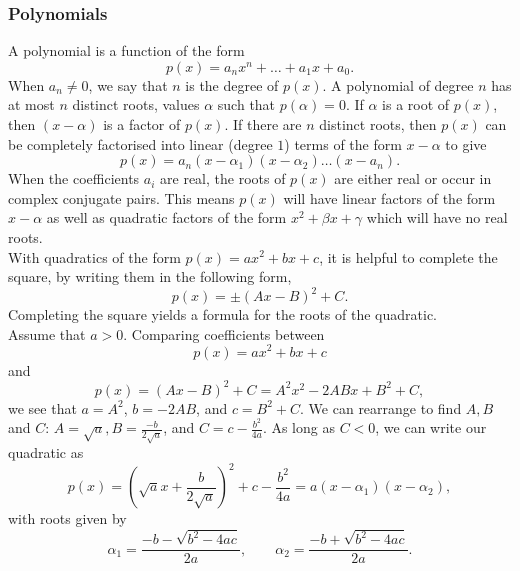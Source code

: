 \documentclass[10pt, a4paper]{article}
\begin{document}
\subsubsection{Polynomials}
A polynomial is a function of the form
\[
p(x) = a_n x ^ n + \dotsc + a_1 x + a_0.
\]
When $a_n \neq 0$, we say that $n$ is the degree of $p(x)$. A polynomial of degree $n$ has at most $n$ distinct roots, values $\alpha$ such that $p(\alpha) = 0$. If $\alpha$ is a root of $p(x)$, then $(x - \alpha)$ is a factor of $p(x)$. If there are $n$ distinct roots, then $p(x)$ can be completely factorised into linear (degree $1$) terms of the form $x - \alpha$ to give
\[
p(x) = a_n (x - \alpha_1)(x - \alpha_2)\dotsc(x - a_n). 
\]
When the coefficients $a_i$ are real, the roots of $p(x)$ are either real or occur in complex conjugate pairs. This means $p(x)$ will have linear factors of the form $x - \alpha$ as well as quadratic factors of the form $x ^ 2 + \beta x + \gamma$ which will have no real roots. \\
With quadratics of the form $p(x) = ax ^ 2 + bx + c$, it is helpful to complete the square, by writing them in the following form,
\[
p(x) = \pm (Ax - B) ^ 2 + C.
\]
Completing the square yields a formula for the roots of the quadratic. \\
Assume that $a > 0$. Comparing coefficients between
\[
p(x) = ax ^ 2 + bx + c
\]
and
\[
p(x) = (Ax - B) ^ 2 + C = A ^ 2 x ^ 2 - 2ABx + B ^ 2 + C,
\]
we see that $a = A ^ 2$, $b = -2AB$, and $c = B ^ 2 + C$. We can rearrange to find $A, B$ and $C$: $A = \sqrt{a}, B = \frac{-b}{2\sqrt{a}}$, and $C = c - \frac{b ^ 2}{4a}$. As long as $C < 0$, we can write our quadratic as
\[
p(x) = \left(\sqrt{a}x + \dfrac{b}{2\sqrt{a}}\right) ^ 2 + c - \dfrac{b ^ 2}{4a} = a(x - \alpha_1)(x - \alpha_2),
\]
with roots given by
\[
\alpha_1 = \dfrac{-b - \sqrt{b ^ 2 - 4ac}}{2a},\qquad\alpha_2 = \dfrac{-b + \sqrt{b ^ 2 - 4ac}}{2a}.
\]
\end{document}
